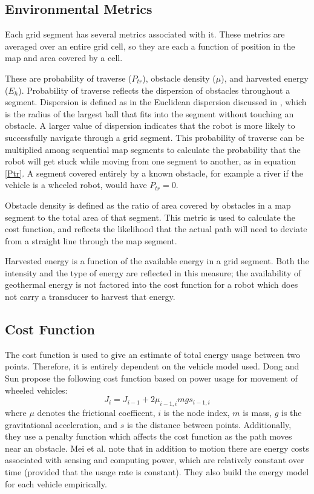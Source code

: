 \documentclass[journal]{IEEEtran}
\begin{document}
\subsection{Environmental Metrics}
Each grid segment has several metrics associated with it. These metrics are averaged over an entire grid cell, so they are each a function of position in the map and area covered by a cell.

These are probability of traverse ($P_{tr}$), obstacle density ($\mu$), and harvested energy ($E_h$). Probability of traverse reflects the dispersion of obstacles throughout a segment. 
Dispersion is defined as in the Euclidean dispersion discussed in \cite{LaValle Branicky Lindeman}, which is the radius of the largest ball that fits into the segment without touching an obstacle. 
A larger value of dispersion indicates that the robot is more likely to successfully navigate through a grid segment.
This probability of traverse can be multiplied among sequential map segments to calculate the probability that the robot will get stuck while moving from one segment to another, as in equation \ref{Ptr}. 
A segment covered entirely by a known obstacle, for example a river if the vehicle is a wheeled robot, would have $P_{tr} = 0$. 

Obstacle density is defined as the ratio of area covered by obstacles in a map segment to the total area of that segment. 
This metric is used to calculate the cost function, and reflects the likelihood that the actual path will need to deviate from a straight line through the map segment. 

Harvested energy is a function of the available energy in a grid segment. Both the intensity and the type of energy are reflected in this measure; the availability of geothermal energy is not factored into the cost function for a robot which does not carry a transducer to harvest that energy.
 
\subsection{Cost Function}
The cost function is used to give an estimate of total energy usage between two points. 
Therefore, it is entirely dependent on the vehicle model used. Dong and Sun \cite{minimizing energy consumption of wheeled mobile robots ...} propose the following cost function based on power usage for movement of wheeled vehicles:
\begin{equation}
J_i = J_{i-1} + 2\mu_{i-1,i}mg s_{i-1,i}
\end{equation}
where $\mu$ denotes the frictional coefficent, $i$ is the node index, $m$ is mass, $g$ is the gravitational acceleration, and $s$ is the distance between points. 
Additionally, they use a penalty function which affects the cost function as the path moves near an obstacle.
Mei et al. \cite{Mei - deployment} note that in addition to motion there are energy costs associated with sensing and computing power, which are relatively constant over time (provided that the usage rate is constant).
They also build the energy model for each vehicle empirically.
\end{document}
